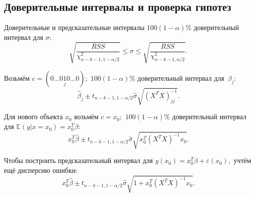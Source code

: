 \documentclass[9pt,pdf,utf8,hyperref={unicode},aspectratio=169]{beamer}
\renewcommand{\leq}{\leqslant}
\begin{document}
\subsection{Доверительные интервалы и проверка гипотез}
\begin{frame}{Доверительные и предсказательные интервалы}
    $100(1-\alpha)$\% доверительный интервал для $\sigma$:
    $$\sqrt{\frac{RSS}{\chi^2_{n-k-1,1-\alpha/2}}} \leq \sigma \leq \sqrt{\frac{RSS}{\chi^2_{n-k-1,\alpha/2}}}.$$

    \bigskip

    Возьмём $c=\left(0\dots0\underset{j}{1}0\dots0\right);$ \; $100(1-\alpha)\%$ доверительный интервал для~$\beta_j$:
    $$\hat{\beta}_j \pm t_{n-k-1,1-\alpha/2}\hat{\sigma} \sqrt{\left(X^TX\right)^{-1}_{jj}}.$$

	\bigskip

    Для нового объекта $x_0$ возьмём $c=x_0;$ \; $100(1-\alpha)\%$ доверительный интервал для $\mathbb{E}\left(y\left|\right.x=x_0\right)=x_0^T\beta$:
    $$x_0^T \hat{\beta} \pm t_{n-k-1,1-\alpha/2}\hat{\sigma} \sqrt{x_0^T \left(X^TX\right)^{-1} x_0}.$$

    \bigskip
    
    Чтобы построить предсказательный интервал для $y\left(x_0\right) = x_0^T\beta + \varepsilon\left(x_0\right),$ учтём ещё дисперсию ошибки:
    $$x_0^T \hat{\beta} \pm t_{n-k-1,1-\alpha/2}\hat{\sigma} \sqrt{1 + x_0^T \left(X^TX\right)^{-1} x_0}.$$
\end{frame}
\end{document}
